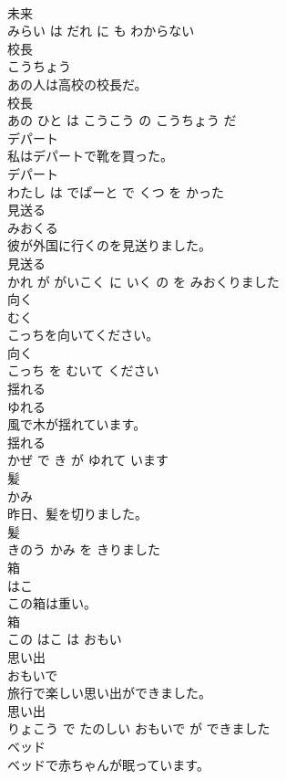 \documentclass[8pt]{extreport}
\begin{document}
\begin{CJK}{UTF8}{min}
\\	未来 
\\	みらい は だれ に も わからない			
\\	校長	
\\	こうちょう			
\\	あの人は高校の校長だ。	
\\	校長 
\\	あの ひと は こうこう の こうちょう だ			
\\	デパート	
\\	私はデパートで靴を買った。	
\\	デパート 
\\	わたし は でぱーと で くつ を かった			
\\	見送る	
\\	みおくる			
\\	彼が外国に行くのを見送りました。	
\\	見送る 
\\	かれ が がいこく に いく の を みおくりました			
\\	向く	
\\	むく			
\\	こっちを向いてください。	
\\	向く 
\\	こっち を むいて ください			
\\	揺れる	
\\	ゆれる			
\\	風で木が揺れています。	
\\	揺れる 
\\	かぜ で き が ゆれて います			
\\	髪	
\\	かみ			
\\	昨日、髪を切りました。	
\\	髪 
\\	きのう かみ を きりました			
\\	箱	
\\	はこ			
\\	この箱は重い。	
\\	箱 
\\	この はこ は おもい			
\\	思い出	
\\	おもいで			
\\	旅行で楽しい思い出ができました。	
\\	思い出 
\\	りょこう で たのしい おもいで が できました			
\\	ベッド	
\\	ベッドで赤ちゃんが眠っています。	

\end{CJK}
\end{document}

